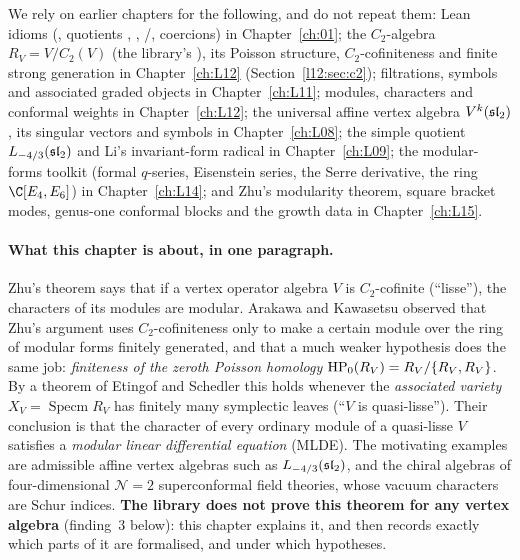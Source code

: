 We rely on earlier chapters for the following, and do not repeat them: Lean idioms
(, quotients , , /, coercions) in
Chapter~\ref{ch:01}; the $C_2$-algebra $R_V = V/C_2(V)$ (the library's ), its Poisson
structure, $C_2$-cofiniteness and finite strong generation in Chapter~\ref{ch:L12}
(Section~\ref{l12:sec:c2}); filtrations, symbols and associated graded objects in
Chapter~\ref{ch:L11}; modules, characters and conformal weights in Chapter~\ref{ch:L12}; the
universal affine vertex algebra $V^k(\mathfrak{sl}_2)$, its singular vectors and symbols in
Chapter~\ref{ch:L08}; the simple quotient $L_{-4/3}(\mathfrak{sl}_2)$ and Li's invariant-form radical in
Chapter~\ref{ch:L09}; the modular-forms toolkit (formal $q$-series, Eisenstein series, the Serre
derivative, the ring $\C[E_4,E_6]$) in Chapter~\ref{ch:L14}; and Zhu's modularity theorem, square
bracket modes, genus-one conformal blocks and the growth data in Chapter~\ref{ch:L15}.

\paragraph{What this chapter is about, in one paragraph.} Zhu's theorem says that if a vertex
operator algebra $V$ is $C_2$-cofinite (``lisse''), the characters of its modules are modular.
Arakawa and Kawasetsu observed that Zhu's argument uses $C_2$-cofiniteness only to make a certain
module over the ring of modular forms finitely generated, and that a much weaker hypothesis does
the same job: \emph{finiteness of the zeroth Poisson homology} $\mathrm{HP}_0(R_V) = R_V/\{R_V,R_V\}$.
By a theorem of Etingof and Schedler this holds whenever the \emph{associated variety}
$X_V = \operatorname{Specm}R_V$ has finitely many symplectic leaves (``$V$ is quasi-lisse''). Their
conclusion is that the character of every ordinary module of a quasi-lisse $V$ satisfies a
\emph{modular linear differential equation} (MLDE). The motivating examples are admissible affine
vertex algebras such as $L_{-4/3}(\mathfrak{sl}_2)$, and the chiral algebras of four-dimensional
$\mathcal N=2$ superconformal field theories, whose vacuum characters are Schur indices.
\textbf{The library does not prove this theorem for any vertex algebra} (finding~3 below): this chapter explains it, and
then records exactly which parts of it are formalised, and under which hypotheses.

